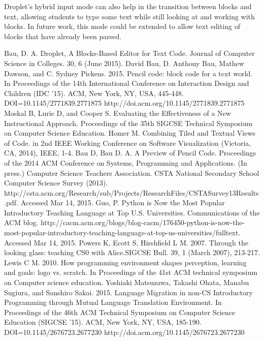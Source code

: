 \documentclass[conference]{IEEEtran}
\begin{document}
Droplet's hybrid input mode can also help in the transition between blocks and text, allowing students to type some text while still looking at and working with blocks. In future work, this mode could be extended to allow text editing of blocks that have already been parsed.

\clearpage

\begin{thebibliography}{1}

  Bau, D. A. Droplet, A Blocks-Based Editor for Text Code. Journal of Computer Science in Colleges. 30, 6 (June 2015).
  David Bau, D. Anthony Bau, Mathew Dawson, and C. Sydney Pickens. 2015. Pencil code: block code for a text world. In Proceedings of the 14th International Conference on Interaction Design and Children (IDC '15). ACM, New York, NY, USA, 445-448. DOI=10.1145/2771839.2771875 http://doi.acm.org/10.1145/2771839.2771875
  Moskal B, Lurie D, and Cooper S. Evaluating the Effectiveness of a New Instructional Approach. Proceedings of the 35th SIGCSE Technical Symposium on Computer Science Education.
  Homer M. Combining Tiled and Textual Views of Code. in 2nd IEEE Working Conference on Software Visualization (Victoria, CA, 2014), IEEE, 1-4.
  Bau D, Bau D. A. A Preview of Pencil Code. Proceedings of the 2014 ACM Conference on Systems, Programming and Applications. (In press.)
  Computer Science Teachers Association. CSTA National Secondary School Computer Science Survey (2013). http://csta.acm.org/Research/sub/Projects/ResearchFiles/CSTASurvey13Results.pdf. Accessed Mar 14, 2015.
  Guo, P. Python is Now the Most Popular Introductory Teaching Language at Top U.S. Universities. Communications of the ACM blog. http://cacm.acm.org/blogs/blog-cacm/176450-python-is-now-the-most-popular-introductory-teaching-language-at-top-us-universities/fulltext. Accessed Mar 14, 2015.
  Powers K, Ecott S, Hirshfield L M. 2007. Through the looking glass: teaching CS0 with Alice.SIGCSE Bull. 39, 1 (March 2007), 213-217.
  Lewis C M. 2010. How programming environment shapes perception, learning and goals: logo vs. scratch. In Proceedings of the 41st ACM technical symposium on Computer science education.
  Yoshiaki Matsuzawa, Takashi Ohata, Manabu Sugiura, and Sanshiro Sakai. 2015. Language Migration in non-CS Introductory Programming through Mutual Language Translation Environment. In Proceedings of the 46th ACM Technical Symposium on Computer Science Education (SIGCSE '15). ACM, New York, NY, USA, 185-190. DOI=10.1145/2676723.2677230 http://doi.acm.org/10.1145/2676723.2677230

\end{thebibliography}
\end{document}
